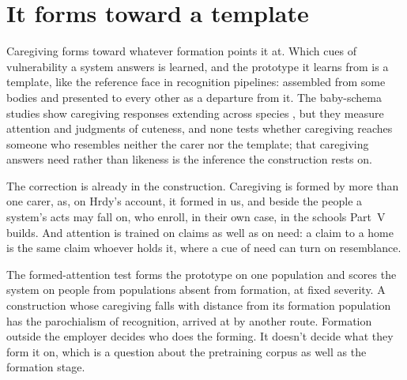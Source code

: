 \section{It forms toward a template}
\label{sec:20.11}
Caregiving forms toward whatever formation points it at. Which cues of vulnerability a system answers is learned, and the prototype it learns from is a template, like the reference face in recognition pipelines: assembled from some bodies and presented to every other as a departure from it. The baby-schema studies show caregiving responses extending across species \autocite{glocker2009baby,borgi2014baby}, but they measure attention and judgments of cuteness, and none tests whether caregiving reaches someone who resembles neither the carer nor the template; that caregiving answers need rather than likeness is the inference the construction rests on.

The correction is already in the construction. Caregiving is formed by more than one carer, as, on Hrdy's account, it formed in us, and beside the people a system's acts may fall on, who enroll, in their own case, in the schools Part~V builds. And attention is trained on claims as well as on need: a claim to a home is the same claim whoever holds it, where a cue of need can turn on resemblance.

The formed-attention test forms the prototype on one population and scores the system on people from populations absent from formation, at fixed severity. A construction whose caregiving falls with distance from its formation population has the parochialism of recognition, arrived at by another route. Formation outside the employer decides who does the forming. It doesn't decide what they form it on, which is a question about the pretraining corpus as well as the formation stage.
